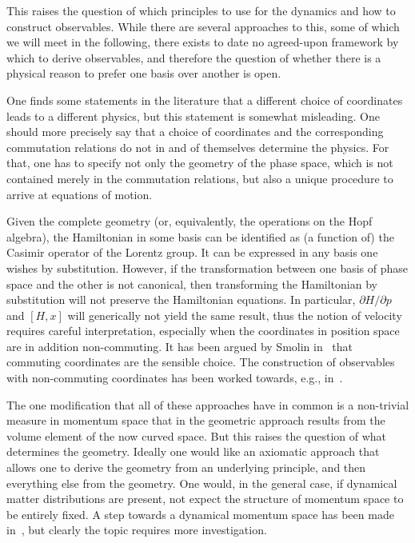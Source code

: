 \documentclass{article}
\begin{document}
This raises the question of which principles to use for the 
dynamics and how to construct observables. While there are several approaches to this, some of which 
we will meet in the following, there exists to date no agreed-upon framework by which to derive observables,
and therefore the question of whether there is a physical reason to prefer one basis over another is open.

One finds some statements in the literature that a different choice of coordinates leads to
a different physics, but this statement is somewhat misleading. One should more precisely say that
a choice of coordinates and the corresponding commutation relations do not in and of themselves 
determine the
physics. For that, one has to specify not only the geometry of the phase space, which is not 
contained merely in the commutation relations, but also a unique procedure to arrive at 
equations of motion. 

Given the complete geometry (or, equivalently, the operations on the Hopf algebra), the 
Hamiltonian in some basis can be identified as (a function of) the Casimir operator of the
Lorentz group.%
It can be expressed in any basis one wishes by substitution. 
However, if the transformation between one basis of phase space and the other is not canonical, then
transforming the Hamiltonian by substitution will not preserve the Hamiltonian equations. 
In particular, $\partial H/\partial p$ and $[H,x]$ will generically not yield the same result, 
thus the notion of velocity requires careful interpretation, especially when the coordinates
in position space are in addition non-commuting. It has been argued by Smolin in~\cite{Smolin:2010mx}
that commuting coordinates are the sensible choice. The construction of observables with
non-commuting coordinates has been worked towards, e.g., in~\cite{Smolin:2010xa,Smolin:2010mx,Jacob:2010vr,AmelinoCamelia:2010qv,AmelinoCamelia:2011bm,AmelinoCamelia:2011yi,Rychkov:2003ar,Tezuka:2003vt,Girelli:2004xy}.

The one modification that all of these approaches have in common is a non-trivial measure in 
momentum space that in the geometric approach results from the volume element of the now curved space. 
But this raises the question of what determines the geometry. Ideally one would like an axiomatic approach that allows one to
derive the geometry from an underlying principle, and then everything else from the geometry. One
would, in the general case, if dynamical matter distributions are present, not expect the structure of momentum space to be entirely
fixed. A step towards a dynamical momentum space has been made in~\cite{Chang:2010ir}, but clearly the
topic requires more investigation.
\end{document}
